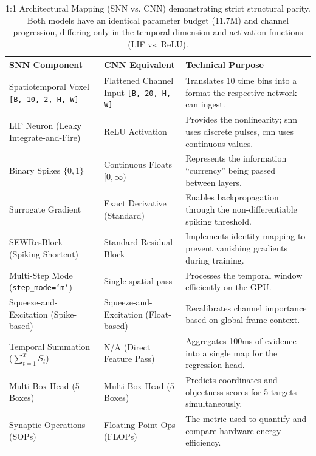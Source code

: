 \begin{table}[htbp]
\centering
\begin{tabularx}{\textwidth}{|>{\raggedright\arraybackslash}p{4.5cm}|>{\raggedright\arraybackslash}p{4cm}|>{\raggedright\arraybackslash}X|}
\hline
\textbf{SNN Component} & \textbf{CNN Equivalent} & \textbf{Technical Purpose} \\
\hline
Spatiotemporal Voxel \texttt{[B, 10, 2, H, W]} & Flattened Channel Input \texttt{[B, 20, H, W]} & Translates 10 time bins into a format the respective network can ingest. \\
\hline
LIF Neuron (Leaky Integrate-and-Fire) & ReLU Activation & Provides the nonlinearity; \gls{snn} uses discrete pulses, \gls{cnn} uses continuous values. \\
\hline
Binary Spikes $\{0, 1\}$ & Continuous Floats $[0, \infty)$ & Represents the information ``currency'' being passed between layers. \\
\hline
Surrogate Gradient & Exact Derivative (Standard) & Enables backpropagation through the non-differentiable spiking threshold. \\
\hline
SEWResBlock (Spiking Shortcut) & Standard Residual Block & Implements identity mapping to prevent vanishing gradients during training. \\
\hline
Multi-Step Mode (\texttt{step\_mode=`m'}) & Single spatial pass & Processes the temporal window efficiently on the GPU. \\
\hline
Squeeze-and-Excitation (Spike-based) & Squeeze-and-Excitation (Float-based) & Recalibrates channel importance based on global frame context. \\
\hline
Temporal Summation ($\sum_{t=1}^{T} S_t$) & N/A (Direct Feature Pass) & Aggregates 100ms of evidence into a single map for the regression head. \\
\hline
Multi-Box Head (5 Boxes) & Multi-Box Head (5 Boxes) & Predicts coordinates and objectness scores for 5 targets simultaneously. \\
\hline
Synaptic Operations (SOPs) & Floating Point Ops (FLOPs) & The metric used to quantify and compare hardware energy efficiency. \\
\hline
\end{tabularx}
\caption{1:1 Architectural Mapping (SNN vs. CNN) demonstrating strict structural parity.
     Both models have an identical parameter budget (11.7M) and channel progression, differing only
     in the temporal dimension and activation functions (LIF vs. ReLU).
}
\label{tab:snn_cnn_mapping}
\end{table}

